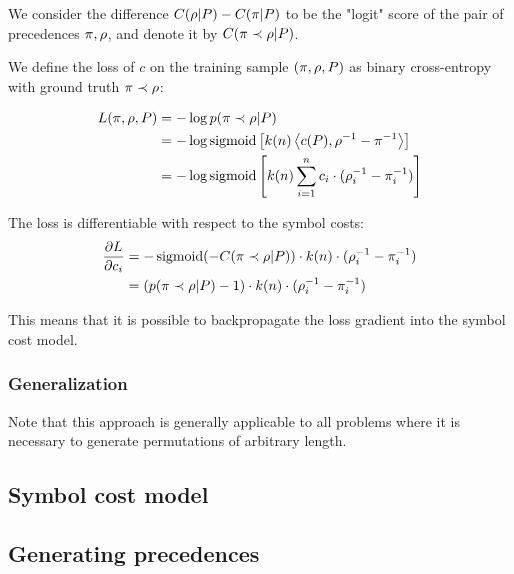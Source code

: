 We consider the difference $C(\rho | P) - C(\pi | P)$
to be the "logit" score of the pair of precedences $\pi, \rho$,
and denote it by $C(\pi \prec \rho | P)$.

We define the loss of $c$ on the training sample $(\pi, \rho, P)$ as binary cross-entropy
with ground truth $\pi \prec \rho$:

\begin{align*}
L(\pi, \rho, P)
&= - \log p(\pi \prec \rho | P) \\
&= - \log \operatorname{sigmoid} \left[k(n) \left<c(P),\rho^{-1} - \pi^{-1}\right>\right] \\
&= - \log \operatorname{sigmoid} \left[k(n) \sum_{i=1}^n c_i \cdot (\rho^{-1}_i - \pi^{-1}_i)\right]
\end{align*}

The loss is differentiable with respect to the symbol costs:
\begin{align*}
\frac{\partial L}{\partial c_i}
&= -\operatorname{sigmoid}(-C(\pi \prec \rho | P)) \cdot k(n) \cdot (\rho^{-1}_i - \pi^{-1}_i) \\
&= (p(\pi \prec \rho | P) - 1) \cdot k(n) \cdot (\rho^{-1}_i - \pi^{-1}_i)
\end{align*}

This means that it is possible to backpropagate the loss gradient into the symbol cost model. 

\subsubsection{Generalization}

Note that this approach is generally applicable to all problems where it is necessary to generate permutations of arbitrary length.


\subsection{Symbol cost model}



\subsection{Generating precedences}
\label{sec:generating}

